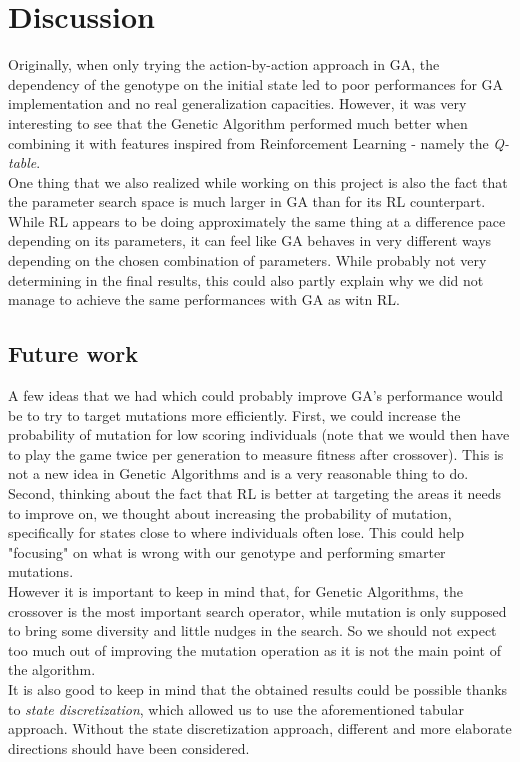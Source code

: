 \section{Discussion}
Originally, when only trying the action-by-action approach in GA, the dependency of the genotype on the initial state led to poor performances for GA implementation and no real generalization capacities.
However, it was very interesting to see that the Genetic Algorithm performed much better when combining it with features inspired from Reinforcement Learning - namely the \textit{Q-table}.
\\
One thing that we also realized while working on this project is also the fact that the parameter search space is much larger in GA than for its RL counterpart. 
While RL appears to be doing approximately the same thing at a difference pace depending on its parameters, it can feel like GA behaves in very different ways depending on the chosen combination of parameters.
While probably not very determining in the final results, this could also partly explain why we did not manage to achieve the same performances with GA as witn RL.
\\

\subsection{Future work}
A few ideas that we had which could probably improve GA's performance would be to try to target mutations more efficiently.
First, we could increase the probability of mutation for low scoring individuals (note that we would then have to play the game twice per generation to measure fitness after crossover).
This is not a new idea in Genetic Algorithms and is a very reasonable thing to do.
\\
Second, thinking about the fact that RL is better at targeting the areas it needs to improve on, we thought about increasing the probability of mutation, specifically for states close to where individuals often lose.
This could help "focusing" on what is wrong with our genotype and performing smarter mutations.
\\
However it is important to keep in mind that, for Genetic Algorithms, the crossover is the most important search operator, while mutation is only supposed to bring some diversity and little nudges in the search.
So we should not expect too much out of improving the mutation operation as it is not the main point of the algorithm.
\\
It is also good to keep in mind that the obtained results could be possible thanks to \textit{state discretization}, which allowed us to use the aforementioned tabular approach.
Without the state discretization approach, different and more elaborate directions should have been considered. 

